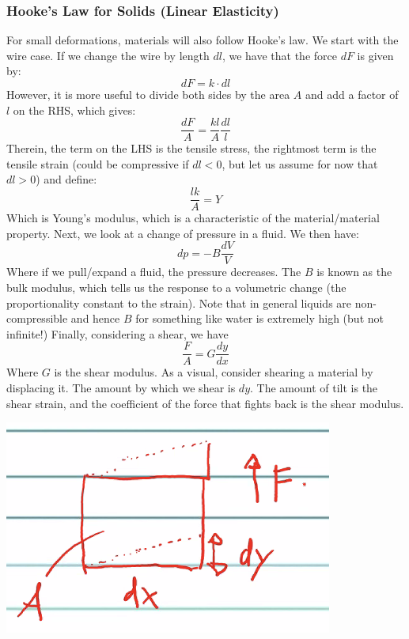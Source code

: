 \subsubsection{Hooke's Law for Solids (Linear Elasticity)}
For small deformations, materials will also follow Hooke's law. We start with the wire case. If we change the wire by length $dl$, we have that the force $dF$ is given by:
\[dF = k\cdot dl\]
However, it is more useful to divide both sides by the area $A$ and add a factor of $l$ on the RHS, which gives:
\[\frac{dF}{A} = \frac{kl}{A}\frac{dl}{l}\]
Therein, the term on the LHS is the tensile stress, the rightmost term is the tensile strain (could be compressive if $dl < 0$, but let us assume for now that $dl > 0$) and define:
\[\frac{lk}{A} = Y\]
Which is Young's modulus, which is a characteristic of the material/material property. 
\newline Next, we look at a change of pressure in a fluid. We then have:
\[dp = -B\frac{dV}{V}\]
Where if we pull/expand a fluid, the pressure decreases. The $B$ is known as the bulk modulus, which tells us the response to a volumetric change (the proportionality constant to the strain). Note that in general liquids are non-compressible and hence $B$ for something like water is extremely high (but not infinite!)
\newline Finally, considering a shear, we have
\[\frac{F}{A} = G\frac{dy}{dx}\]
Where $G$ is the shear modulus. As a visual, consider shearing a material by displacing it. The amount by which we shear is $dy$. The amount of tilt is the shear strain, and the coefficient of the force that fights back is the shear modulus.
\begin{center}
    \includegraphics[]{Lecture-30/l30-img6.png}
\end{center}

